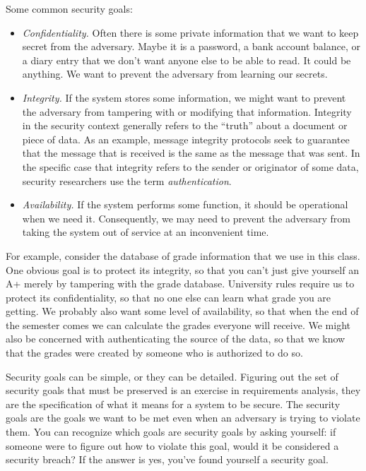 \documentclass[11pt]{article}
\begin{document}
Some common security goals: 
\begin{itemize}
\item {\em Confidentiality.} Often there is some
private information that we want to keep secret from the
adversary. Maybe it is a password, a bank account balance, or a diary
entry that we don't want anyone else to be able to read. It could be
anything. We want to prevent the adversary from learning our
secrets. 
\item {\em Integrity.} If the system stores some information, we might
  want to prevent the adversary from tampering with or modifying that
  information.  Integrity in the security context generally refers to
  the ``truth'' about a document or piece of data.  As an example,
  message integrity protocols seek to guarantee that the message that
  is received is the same as the message that was sent.  In the
  specific case that integrity refers to the sender or originator of
  some data, security researchers use the term {\em authentication}.
\item {\em Availability.} If the system performs some
function, it should be operational when we need it. Consequently, we
may need to prevent the adversary from taking the system out of
service at an inconvenient time.
\end{itemize}

For example, consider the
database of grade information that we use in this class. One obvious
goal is to protect its integrity, so that you can't just give yourself
an A+ merely by tampering with the grade database. University rules
require us to protect its confidentiality, so that no one else can
learn what grade you are getting. We probably also want some level of
availability, so that when the end of the semester comes we can
calculate the grades everyone will receive.  We might also be concerned with
authenticating the source of the data, so that we know that the grades were
created by someone who is authorized to do so.

Security goals can be
simple, or they can be detailed. Figuring out the set of security
goals that must be preserved is an exercise in requirements
analysis, they are the specification of what it means for a system to be
secure. The security goals are the goals we want to be met even when
an adversary is trying to violate them. You can recognize which goals
are security goals by asking yourself: if someone were to figure out
how to violate this goal, would it be considered a security breach? If
the answer is yes, you've found yourself a security goal. 
\end{document}
